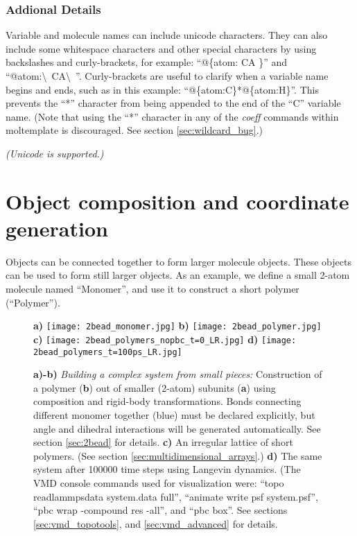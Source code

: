 \documentclass[11pt]{article}
\begin{document}
\subsubsection*{Addional Details}
Variable and molecule names can include unicode characters.
They can also include some whitespace characters and other special characters
by using backslashes and curly-brackets, for example:
``@\{atom: CA \}'' and ``@atom:\textbackslash\ CA\textbackslash\ ''.
Curly-brackets are useful to clarify when a variable name begins and ends,
such as in this example: ``@\{atom:C\}*@\{atom:H\}''.
This prevents the ``*'' character from being appended to the end of the 
``C'' variable name.
(Note that using the ``*'' character in any of the \textit{coeff} commands
within moltemplate is discouraged.  See section \ref{sec:wildcard_bug}.)

\textit{(Unicode is supported.)}


\pagebreak
\section{ Object composition and coordinate generation }
\label{sec:coordinates}

Objects can be connected together to form larger molecule objects.
These objects can be used to form still larger objects.
As an example, we define a small 2-atom molecule named ``Monomer'',
and use it to construct a short polymer (``Polymer'').

\begin{figure}[htbp]
\centering
\textbf{a)}
\texttt{[image: 2bead\_monomer.jpg]}
\quad \quad \quad \quad \quad
\textbf{b)}
\texttt{[image: 2bead\_polymer.jpg]}
\newline
\vspace{10 mm}
\newline
\textbf{c)}
\texttt{[image: 2bead\_polymers\_nopbc\_t=0\_LR.jpg]}
\textbf{d)}
\texttt{[image: 2bead\_polymers\_t=100ps\_LR.jpg]}
\caption{
\label{fig:2bead_polymer}
\textbf{a)-b)}
\textit{Building a complex system from small pieces:}
Construction of a polymer (\textbf{b}) 
out of smaller (2-atom) subunits (\textbf{a})
using composition and rigid-body transformations. 
Bonds connecting different monomer together (blue) 
must be declared explicitly, 
but angle and dihedral interactions will be generated automatically.
See section \ref{sec:2bead} for details.
\textbf{c)}
An irregular lattice of short polymers.
(See section \ref{sec:multidimensional_arrays}.)
\textbf{d)}
The same system after 100000 time steps using Langevin dynamics.
(The VMD console commands used for visualization were:
``topo readlammpsdata system.data full'',
``animate write psf system.psf'',
``pbc wrap -compound res -all'', and 
``pbc box''.
See sections \ref{sec:vmd_topotools}, and \ref{sec:vmd_advanced}
for details.}
\end{figure}
\end{document}
